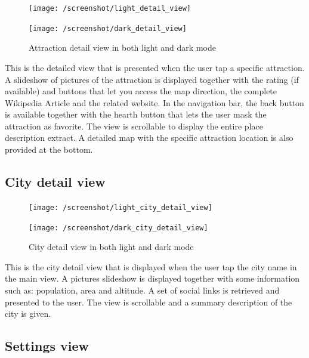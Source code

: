 \documentclass[a4paper, 11pt, parskip=half]{scrreprt}
\theoremstyle{definition}
\begin{document}
\begin{figure}[H]
	\centering
	\begin{minipage}{.5\textwidth}
  	\centering
  	\texttt{[image: /screenshot/light\_detail\_view]}
  	\label{fig:test1}
	\end{minipage}%
	\begin{minipage}{.5\textwidth}
  	\centering
  	\texttt{[image: /screenshot/dark\_detail\_view]}
  	\label{fig:test2}
	\end{minipage}
	\caption{Attraction detail view in both light and dark mode}
\end{figure}

This is the detailed view that is presented when the user tap a specific attraction. A slideshow of pictures of the attraction is displayed together with the rating (if available) and buttons that let you access the map direction, the complete Wikipedia Article and the related website.
In the navigation bar, the back button is available together with the hearth button that lets the user mask the attraction as favorite. The view is scrollable to display the entire place description extract. A detailed map with the specific attraction location is also provided at the bottom. 

\subsection{City detail view}

\begin{figure}[H]
	\centering
	\begin{minipage}{.5\textwidth}
  	\centering
  	\texttt{[image: /screenshot/light\_city\_detail\_view]}
  	\label{fig:test1}
	\end{minipage}%
	\begin{minipage}{.5\textwidth}
  	\centering
  	\texttt{[image: /screenshot/dark\_city\_detail\_view]}
  	\label{fig:test2}
	\end{minipage}
	\caption{City detail view in both light and dark mode}
\end{figure}

This is the city detail view that is displayed when the user tap the city name in the main view. A pictures slideshow is displayed together with some information such as: population, area and altitude. A set of social links is retrieved and presented to the user. The view is scrollable and a summary description of the city is given.


\subsection{Settings view}
\end{document}
